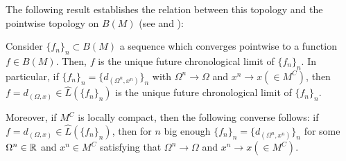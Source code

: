 




            The following result establishes the relation between this topology and the pointwise topology on $B(M)$ (see \cite[Prop. 3.2]{FHSIso2} and \cite[Prop. 5.29]{FHSBuseman}):
            \begin{prop}\label{prel:PropToponefibre}
              Consider $\{f_n\}_n\subset B(M)$ a sequence which converges pointwise to a function $f\in B(M)$. Then, $f$ is the unique future chronological limit of $\{f_n\}_n$. In particular, if $\{f_n\}_n=\{d_{(\Omega^n,x^n)}\}_n$ with $\Omega^n\rightarrow \Omega$ and $x^n\rightarrow x (\in M^C)$, then $f=d_{(\Omega,x)}\in \hat{L}(\{f_n\}_n)$ is the unique future chronological limit of $\{f_n\}_n$.

              Moreover, if $M^C$ is locally compact, then the following converse follows: if $f=d_{(\Omega,x)}\in \hat{L}(\{f_n\}_n)$, then for $n$ big enough $\{f_n\}_n=\{d_{(\Omega^n,x^n)}\}_n$ for some $\Omega^n\in {\mathbb R}$ and $x^n\in M^C$ satisfying that $\Omega^n\rightarrow \Omega$ and $x^n\rightarrow x (\in M^C)$.
            \end{prop}


